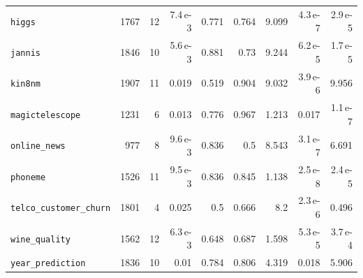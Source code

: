 \begin{table}[htbp]
\begin{tabular}{lrrrrrrrr}
\texttt{higgs} & 1767 & 12 & 7.4\,e-3 & 0.771 & 0.764 & 9.099 & 4.3\,e-7 & 2.9\,e-5 \\
\texttt{jannis} & 1846 & 10 & 5.6\,e-3 & 0.881 & 0.73 & 9.244 & 6.2\,e-5 & 1.7\,e-5 \\
\texttt{kin8nm} & 1907 & 11 & 0.019 & 0.519 & 0.904 & 9.032 & 3.9\,e-6 & 9.956 \\
\texttt{magictelescope} & 1231 & 6 & 0.013 & 0.776 & 0.967 & 1.213 & 0.017 & 1.1\,e-7 \\
\texttt{online\_news} & 977 & 8 & 9.6\,e-3 & 0.836 & 0.5 & 8.543 & 3.1\,e-7 & 6.691 \\
\texttt{phoneme} & 1526 & 11 & 9.5\,e-3 & 0.836 & 0.845 & 1.138 & 2.5\,e-8 & 2.4\,e-5 \\
\texttt{telco\_\allowbreak customer\_\allowbreak churn} & 1801 & 4 & 0.025 & 0.5 & 0.666 & 8.2 & 2.3\,e-6 & 0.496 \\
\texttt{wine\_quality} & 1562 & 12 & 6.3\,e-3 & 0.648 & 0.687 & 1.598 & 5.3\,e-5 & 3.7\,e-4 \\
\texttt{year\_\allowbreak prediction} & 1836 & 10 & 0.01 & 0.784 & 0.806 & 4.319 & 0.018 & 5.906 \\
\bottomrule
\end{tabular}
\end{table}

